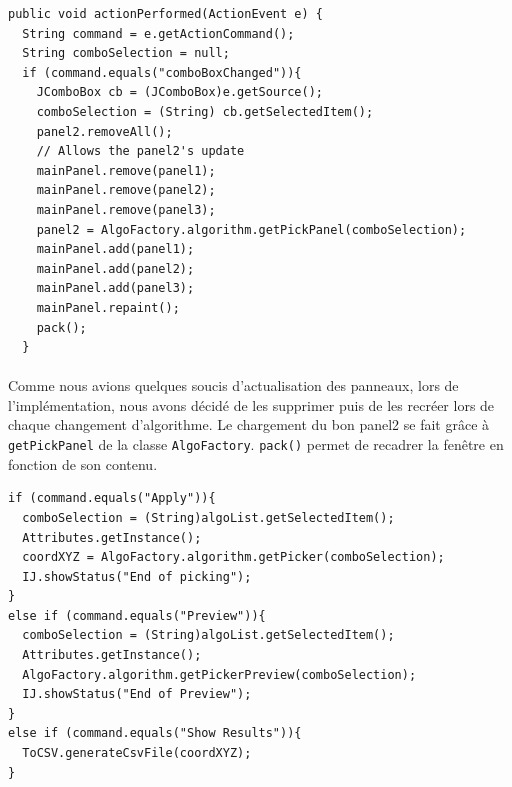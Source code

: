 \begin{center}
\begin{fmpage}{15cm}
\begin{small}
\begin{lstlisting}[breaklines=true, breakatwhitespace=true]
public void actionPerformed(ActionEvent e) {
  String command = e.getActionCommand();
  String comboSelection = null;
  if (command.equals("comboBoxChanged")){
    JComboBox cb = (JComboBox)e.getSource();
    comboSelection = (String) cb.getSelectedItem();
    panel2.removeAll();
    // Allows the panel2's update
    mainPanel.remove(panel1);
    mainPanel.remove(panel2);
    mainPanel.remove(panel3);
    panel2 = AlgoFactory.algorithm.getPickPanel(comboSelection);
    mainPanel.add(panel1);
    mainPanel.add(panel2);
    mainPanel.add(panel3);
    mainPanel.repaint();
    pack();
  }
\end{lstlisting}
\end{small}
\end{fmpage}
\end{center}

\paragraph*{}
Comme nous avions quelques soucis d'actualisation des panneaux, lors de l'implémentation, nous avons décidé de les supprimer puis de les recréer lors de chaque changement d'algorithme. Le chargement du bon panel2 se fait gr\^ace à \texttt{getPickPanel} de la classe \texttt{AlgoFactory}. \texttt{pack()} permet de recadrer la fenêtre en fonction de son contenu. 

\begin{center}
\begin{fmpage}{15cm}
\begin{small}
\begin{lstlisting}
if (command.equals("Apply")){
  comboSelection = (String)algoList.getSelectedItem();
  Attributes.getInstance();
  coordXYZ = AlgoFactory.algorithm.getPicker(comboSelection);
  IJ.showStatus("End of picking");
}
else if (command.equals("Preview")){
  comboSelection = (String)algoList.getSelectedItem();
  Attributes.getInstance();
  AlgoFactory.algorithm.getPickerPreview(comboSelection);
  IJ.showStatus("End of Preview");
}
else if (command.equals("Show Results")){
  ToCSV.generateCsvFile(coordXYZ);
}
\end{lstlisting}
\end{small}	
\end{fmpage}
\end{center}
%
